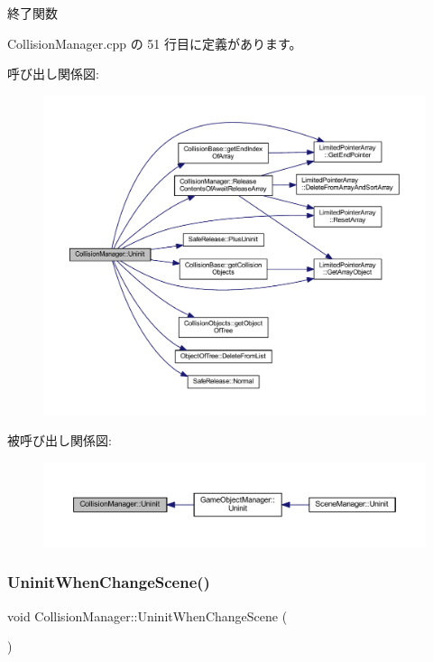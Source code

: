 終了関数 



 Collision\+Manager.\+cpp の 51 行目に定義があります。

呼び出し関係図\+:
\nopagebreak
\begin{figure}[H]
\begin{center}
\leavevmode
\includegraphics[width=350pt]{class_collision_manager_abfa4b87f3ce102f0d173e112e7963f09_cgraph}
\end{center}
\end{figure}
被呼び出し関係図\+:
\nopagebreak
\begin{figure}[H]
\begin{center}
\leavevmode
\includegraphics[width=350pt]{class_collision_manager_abfa4b87f3ce102f0d173e112e7963f09_icgraph}
\end{center}
\end{figure}
\mbox{\label{class_collision_manager_a33ce56b5a6f68d71b0f2bf733413dddb}} 
\subsubsection{\texorpdfstring{Uninit\+When\+Change\+Scene()}{UninitWhenChangeScene()}}
{\footnotesize\ttfamily void Collision\+Manager\+::\+Uninit\+When\+Change\+Scene (\begin{DoxyParamCaption}{ }\end{DoxyParamCaption})}



